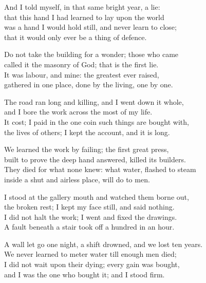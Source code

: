 \begin{founder}
And I told myself, in that same bright year, a lie:\\
that this hand I had learned to lay upon the world\\
was a hand I would hold still, and never learn to close;\\
that it would only ever be a thing of defence.\\

\ornament

Do not take the building for a wonder; those who came\\
called it the masonry of God; that is the first lie.\\
It was labour, and mine: the greatest ever raised,\\
gathered in one place, done by the living, one by one.\\
\medskip

The road ran long and killing, and I went down it whole,\\
and I bore the work across the most of my life.\\
It cost; I paid in the one coin such things are bought with,\\
the lives of others; I kept the account, and it is long.\\
\medskip

We learned the work by failing; the first great press,\\
built to prove the deep hand answered, killed its builders.\\
They died for what none knew: what water, flashed to steam\\
inside a shut and airless place, will do to men.\\
\medskip

I stood at the gallery mouth and watched them borne out,\\
the broken rest; I kept my face still, and said nothing.\\
I did not halt the work; I went and fixed the drawings.\\
A fault beneath a stair took off a hundred in an hour.\\
\medskip

A wall let go one night, a shift drowned, and we lost ten years.\\
We never learned to meter water till enough men died;\\
I did not wait upon their dying; every gain was bought,\\
and I was the one who bought it; and I stood firm.\\
\medskip


\end{founder}
